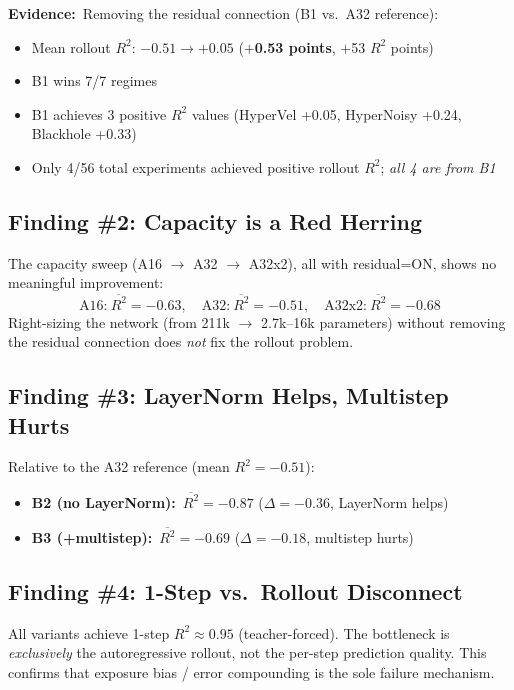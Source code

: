\documentclass[11pt,letterpaper]{article}
\newcommand{\Rtwo}{R^2}
\newcommand{\good}[1]{\textcolor{goodgreen}{\textbf{#1}}}
\begin{document}
\textbf{Evidence:}\ Removing the residual connection (B1 vs.\ A32 reference):
\begin{itemize}[nosep]
  \item Mean rollout $\Rtwo$: $-0.51 \to +0.05$ \quad (\good{$+$0.53 points}, $+$53 $\Rtwo$ points)
  \item B1 wins 7/7 regimes
  \item B1 achieves 3 positive $\Rtwo$ values (HyperVel +0.05, HyperNoisy +0.24, Blackhole +0.33)
  \item Only 4/56 total experiments achieved positive rollout $\Rtwo$; \emph{all 4 are from B1}
\end{itemize}

\subsection{Finding \#2: Capacity is a Red Herring}

The capacity sweep (A16 $\to$ A32 $\to$ A32x2), all with residual=ON, shows no
meaningful improvement:
\[
  \text{A16:}\ \overline{\Rtwo}\!=\!{-0.63}, \quad
  \text{A32:}\ \overline{\Rtwo}\!=\!{-0.51}, \quad
  \text{A32x2:}\ \overline{\Rtwo}\!=\!{-0.68}
\]
Right-sizing the network (from 211k $\to$ 2.7k--16k parameters) without
removing the residual connection does \emph{not} fix the rollout problem.

\subsection{Finding \#3: LayerNorm Helps, Multistep Hurts}

Relative to the A32 reference (mean $\Rtwo = -0.51$):
\begin{itemize}[nosep]
  \item \textbf{B2 (no LayerNorm):}\ $\overline{\Rtwo} = -0.87$ \quad ($\Delta = -0.36$, LayerNorm helps)
  \item \textbf{B3 (+multistep):}\ $\overline{\Rtwo} = -0.69$ \quad ($\Delta = -0.18$, multistep hurts)
\end{itemize}

\subsection{Finding \#4: 1-Step vs.\ Rollout Disconnect}
All variants achieve 1-step $\Rtwo \approx 0.95$ (teacher-forced).  The bottleneck
is \emph{exclusively} the autoregressive rollout, not the per-step prediction quality.
This confirms that exposure bias / error compounding is the sole failure mechanism.
\end{document}
